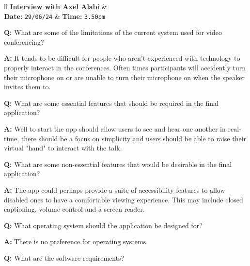 \begin{tcolorbox}[
  boxrule=0pt, frame empty, colback=lightestgray, arc=0pt,
  breakable, colframe=white
]
  \begin{tblr}{ll}
    \textbf{Interview with Axel Alabi} & {}\\
    \textbf{Date: } \texttt{29/06/24} &
    {\hspace{-1.5cm} \textbf{Time: } \texttt{3.50pm}}
  \end{tblr}

  \vspace{0.2cm}

  \textbf{Q:} What are some of the limitations of the current
  system used for video conferencing? \vspace{0.05cm}

  \textbf{A:} It tends to be difficult for people who aren't 
  experienced with technology to properly interact in the 
  conferences. Often times participants will accidently turn 
  their microphone on or are unable to turn their microphone
  on when the speaker invites them to. \vspace{0.25cm}

  \textbf{Q:} What are some essential features that should be
  required in the final application? \vspace{0.05cm}

  \textbf{A:} Well to start the app should allow users to see 
  and hear one another in real-time, there should be a focus on
  simplicity and users should be able to raise their virtual 
  "hand" to interact with the talk. \vspace{0.25cm}

  \textbf{Q:} What are some non-essential features that would
  be desirable in the final application? \vspace{0.05cm}

  \textbf{A:} The app could perhaps provide a suite of 
  accessibility features to allow disabled ones to have a 
  comfortable viewing experience. This may include closed
  captioning, volume control and a screen reader.
  \vspace{0.25cm}

  \textbf{Q:} What operating system should the application be 
  designed for? \vspace{0.05cm}

  \textbf{A:} There is no preference for operating systems.
  \vspace{0.25cm}

  \textbf{Q:} What are the software requirements? 
  \vspace{0.05cm}


\end{tcolorbox}
